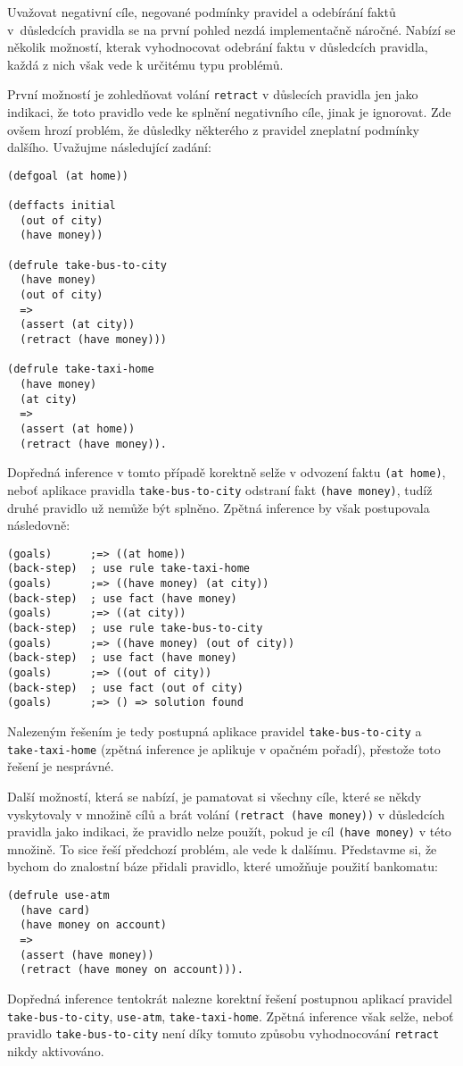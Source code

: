 Uvažovat negativní cíle, negované podmínky pravidel a odebírání faktů
v~důsledcích pravidla se na první pohled nezdá implementačně náročné. Nabízí se
několik možností, kterak vyhodnocovat odebrání faktu v důsledcích pravidla,
každá z nich však vede k určitému typu problémů.

První možností je zohledňovat volání \verb|retract| v důslecích pravidla jen
jako indikaci, že toto pravidlo vede ke splnění negativního cíle, jinak je
ignorovat. Zde ovšem hrozí problém, že důsledky některého z pravidel zneplatní
podmínky dalšího. Uvažujme následující zadání:
\begin{verbatim}
(defgoal (at home))

(deffacts initial
  (out of city)
  (have money))

(defrule take-bus-to-city
  (have money)
  (out of city)
  =>
  (assert (at city))
  (retract (have money)))

(defrule take-taxi-home
  (have money)
  (at city)
  =>
  (assert (at home))
  (retract (have money)).
\end{verbatim}
Dopředná inference v tomto případě korektně selže v odvození faktu
\verb|(at home)|, neboť aplikace pravidla \verb|take-bus-to-city| odstraní fakt
\verb|(have money)|, tudíž druhé pravidlo už nemůže být splněno. Zpětná
inference by však postupovala následovně:
\begin{verbatim}
(goals)      ;=> ((at home))
(back-step)  ; use rule take-taxi-home
(goals)      ;=> ((have money) (at city))
(back-step)  ; use fact (have money)
(goals)      ;=> ((at city))
(back-step)  ; use rule take-bus-to-city
(goals)      ;=> ((have money) (out of city))
(back-step)  ; use fact (have money)
(goals)      ;=> ((out of city))
(back-step)  ; use fact (out of city)
(goals)      ;=> () => solution found
\end{verbatim}
Nalezeným řešením je tedy postupná aplikace pravidel \verb|take-bus-to-city| a
\verb|take-taxi-home| (zpětná inference je aplikuje v opačném pořadí), přestože
toto řešení je nesprávné.

Další možností, která se nabízí, je pamatovat si všechny cíle, které se někdy
vyskytovaly v množině cílů a brát volání \verb|(retract (have money))| v
důsledcích pravidla jako indikaci, že pravidlo nelze použít, pokud je cíl
\verb|(have money)| v této množině. To sice řeší předchozí problém, ale vede k
dalšímu. Představme si, že bychom do znalostní báze přidali pravidlo, které
umožňuje použití bankomatu:
\begin{verbatim}
(defrule use-atm
  (have card)
  (have money on account)
  =>
  (assert (have money))
  (retract (have money on account))).
\end{verbatim}
Dopředná inference tentokrát nalezne korektní řešení postupnou aplikací pravidel
\verb|take-bus-to-city|, \verb|use-atm|, \verb|take-taxi-home|. Zpětná inference
však selže, neboť pravidlo \verb|take-bus-to-city| není díky tomuto způsobu
vyhodnocování \verb|retract| nikdy aktivováno.

